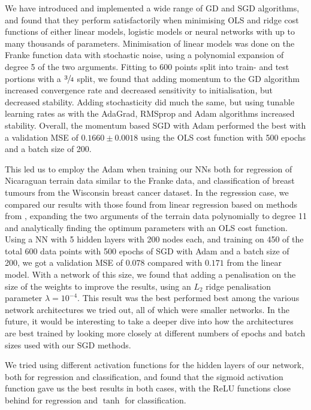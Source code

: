 We have introduced and implemented a wide range of GD and SGD algorithms, and found that they perform satisfactorily when minimising OLS and ridge cost functions of either linear models, logistic models or neural networks with up to many thousands of parameters. Minimisation of linear models was done on the Franke function data with stochastic noise, using a polynomial expansion of degree 5 of the two arguments. Fitting to 600 points split into train- and test portions with a $\sfrac{3}{4}$ split, we found that adding momentum to the GD algorithm increased convergence rate and decreased sensitivity to initialisation, but decreased stability. Adding stochasticity did much the same, but using tunable learning rates as with the AdaGrad, RMSprop and Adam algorithms increased stability. Overall, the momentum based SGD with Adam performed the best with a validation MSE of $0.1660 \pm 0.0018$ using the OLS cost function with 500 epochs and a batch size of 200.

This led us to employ the Adam when training our NNs both for regression of Nicaraguan terrain data similar to the Franke data, and classification of breast tumours from the Wisconsin breast cancer dataset. In the regression case, we compared our results with those found from linear regression based on methods from \cite{Project1}, expanding the two arguments of the terrain data polynomially to degree 11 and analytically finding the optimum parameters with an OLS cost function. Using a NN with 5 hidden layers with 200 nodes each, and training on 450 of the total 600 data points with 500 epochs of SGD with Adam and a batch size of 200, we got a validation MSE of $0.078$ compared with $0.171$ from the linear model. With a network of this size, we found that adding a penalisation on the size of the weights to improve the results, using an $L_2$ ridge penalisation parameter $\lambda = 10^{-4}$. This result was the best performed best among the various network architectures we tried out, all of which were smaller networks. In the future, it would be interesting to take a deeper dive into how the architectures are best trained by looking more closely at different numbers of epochs and batch sizes used with our SGD methods.

We tried using different activation functions for the hidden layers of our network, both for regression and classification, and found that the sigmoid activation function gave us the best results in both cases, with the ReLU functions close behind for regression and $\tanh$ for classification. 

